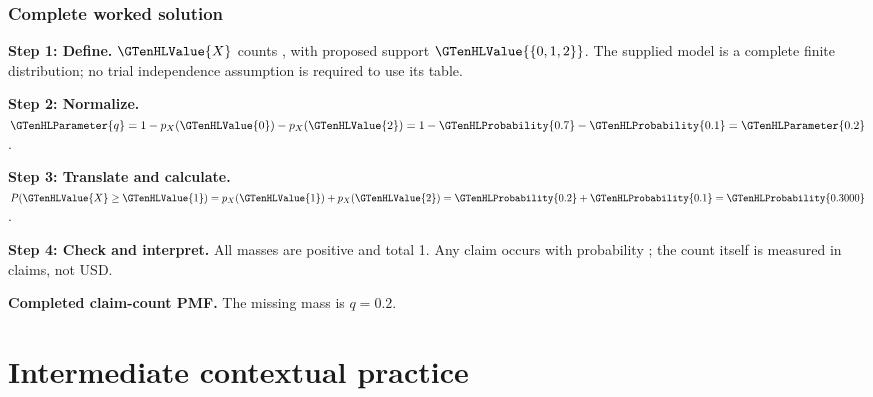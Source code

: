 \subsubsection*{Complete worked solution}
\par\noindent\begin{minipage}{\linewidth}
\textbf{Step 1: Define.} $\GTenHLValue{X}$ counts , with proposed support $\GTenHLValue{\{0,1,2\}}$. The supplied model is a complete finite distribution; no trial independence assumption is required to use its table.
\end{minipage}\par\medskip
\par\noindent\begin{minipage}{\linewidth}
\textbf{Step 2: Normalize.} $\GTenHLParameter{q}=1-p_X(\GTenHLValue{0})-p_X(\GTenHLValue{2})=1-\GTenHLProbability{0.7}-\GTenHLProbability{0.1}=\GTenHLParameter{0.2}$.
\end{minipage}\par\medskip
\par\noindent\begin{minipage}{\linewidth}
\textbf{Step 3: Translate and calculate.} $P(\GTenHLValue{X}\geq\GTenHLValue{1})=p_X(\GTenHLValue{1})+p_X(\GTenHLValue{2})=\GTenHLProbability{0.2}+\GTenHLProbability{0.1}=\GTenHLProbability{0.3000}$.
\end{minipage}\par\medskip
\par\noindent\begin{minipage}{\linewidth}
\textbf{Step 4: Check and interpret.} All masses are positive and total 1. Any claim occurs with probability ; the count itself is measured in claims, not USD.
\end{minipage}\par\medskip
\par\noindent \begin{minipage}[t]{.485\linewidth}
\centering
{}
\par\small \textbf{Completed claim-count PMF.} The missing mass is $q=0.2$.
\end{minipage}\par\medskip

\section{Intermediate contextual practice}\label{sec:t2-c1-intermediate}
